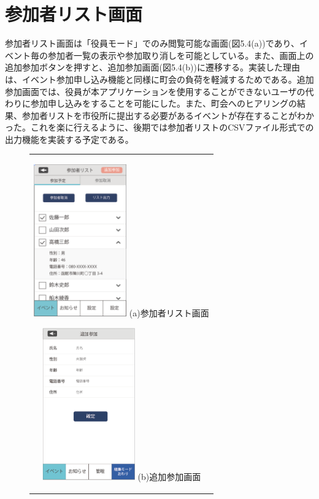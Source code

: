 \section{参加者リスト画面}%
参加者リスト画面は「役員モード」でのみ閲覧可能な画面(図5.4(a))であり、イベント毎の参加者一覧の表示や参加取り消しを可能としている。また、画面上の追加参加ボタンを押すと、追加参加画面(図5.4(b))に遷移する。実装した理由は、イベント参加申し込み機能と同様に町会の負荷を軽減するためである。追加参加画面では、役員が本アプリケーションを使用することができないユーザの代わりに参加申し込みをすることを可能にした。また、町会へのヒアリングの結果、参加者リストを市役所に提出する必要があるイベントが存在することがわかった。これを楽に行えるように、後期では参加者リストのCSVファイル形式での出力機能を実装する予定である。

\begin{figure}[htbp]
  \begin{center}
    \begin{tabular}{c}

      \begin{minipage}{0.33\hsize}
        \begin{center}
\includegraphics[width=4cm]{participant_list}
          \hspace{1cm} %
          {\footnotesize (a)参加者リスト画面}
        \end{center}
      \end{minipage}

      \begin{minipage}{0.33\hsize}
        \begin{center}
\includegraphics[width=4cm]{participant_add.png}
          \hspace{1cm}%
          {\footnotesize (b)追加参加画面}
        \end{center}
      \end{minipage}


\end{tabular}
\end{center}
\end{figure}
